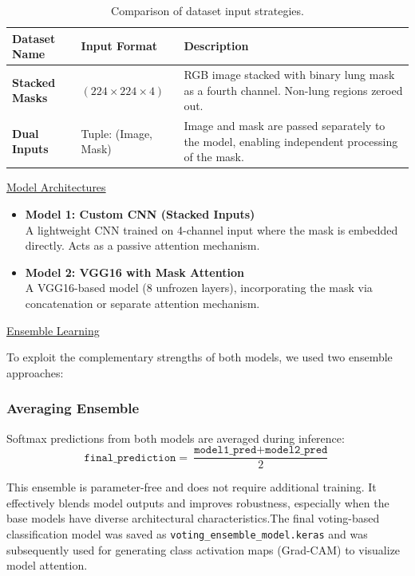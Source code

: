 \documentclass{article}
\begin{document}
\begin{table}[H]
\centering
\begin{tabular}{|l|l|p{8cm}|}
\hline
\textbf{Dataset Name} & \textbf{Input Format} & \textbf{Description} \\
\hline
\textbf{Stacked Masks} & $(224 \times 224 \times 4)$ & RGB image stacked with binary lung mask as a fourth channel. Non-lung regions zeroed out. \\
\hline
\textbf{Dual Inputs} & Tuple: (Image, Mask) & Image and mask are passed separately to the model, enabling independent processing of the mask. \\
\hline
\end{tabular}
\caption{Comparison of dataset input strategies.}
\end{table}

\underline{Model Architectures}

\begin{itemize}
  \item \textbf{Model 1: Custom CNN (Stacked Inputs)}\\
  A lightweight CNN trained on 4-channel input where the mask is embedded directly. Acts as a passive attention mechanism.
  
  \item \textbf{Model 2: VGG16 with Mask Attention}\\
  A VGG16-based model (8 unfrozen layers), incorporating the mask via concatenation or separate attention mechanism.
\end{itemize}

\underline{Ensemble Learning}

To exploit the complementary strengths of both models, we used two ensemble approaches:

\subsubsection*{Averaging Ensemble}
Softmax predictions from both models are averaged during inference:
\[
\texttt{final\_prediction} = \frac{\texttt{model1\_pred} + \texttt{model2\_pred}}{2}
\]

This ensemble is parameter-free and does not require additional training. It effectively blends model outputs and improves robustness, especially when the base models have diverse architectural characteristics.The final voting-based classification model was saved as \texttt{voting\_ensemble\_model.keras} and was subsequently used for generating class activation maps (Grad-CAM) to visualize model attention.
\end{document}
